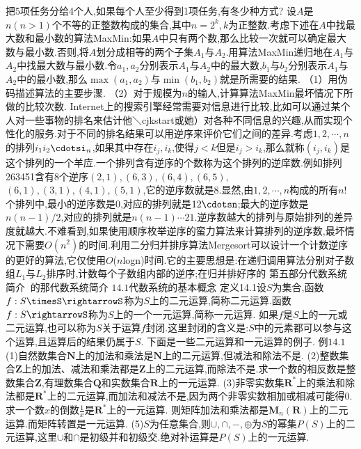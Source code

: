 把5项任务分给4个人,如果每个人至少得到1项任务,有冬少种方式?
设$A$是$n(n>1)$个不等的正整数构成的集合,其中$n=2^{k},k$为正整数.考虑下述在$A$中找最大数和最小数的算法MaxMin:如果$A$中只有两个数,那么比较一次就可以确定最大数与最小数.否则,将$A$划分成相等的两个子集$A_{1}$与$A_{2}$.用算法MaxMin递归地在$A_{1}$与$A_{2}$中找最大数与最小数.令$a_{1},a_{2}$分别表示$A_{1}$与$A_{2}$中的最大数,$b_{1}$与$b_{2}$分别表示$A_{1}$与$A_{2}$中的最小数,那么$\max\left(a_{1},a_{2}\right)$与$\min\left(b_{1},b_{2}\right)$就是所需要的结果.
（1）用伪码描述算法的主要步㵵.
（2）对于规模为$n$的输人,计算算法MaxMin最坏情况下所做的比较次数.
Internet上的搜索引擎经常需要对信息进行比较,比如可以通过某个人对一些事物的排名来估计他＼cjkstart或她）对各种不同信息的兴趣,从而实现个性化的服务.对于不同的排名结果可以用逆序来评价它们之间的差异.考虑$1,2,\cdots,n$的排列$i_{1}i_{2}\cdotsi_{n}$,如果其中存在$i_{j},i_{k}$,使得$j<k$但是$i_{j}>i_{k}$,那么就称$\left(i_{j},i_{k}\right)$是这个排列的一个羊㡴.一个排列含有逆序的个数称为这个排列的逆庠数.例如排列263451含有8个逆序$(2,1),(6,3),(6,4),(6,5)$,$(6,1),(3,1),(4,1),(5,1)$,它的逆序数就是8.显然,由$1,2,\cdots,n$构成的所有$n$!个排列中,最小的逆序数是0,对应的排列就是$12\cdotsn$;最大的逆序数是$n(n-1)/2$,对应的排列就是$n(n-1)\cdots21$.逆序数越大的排列与原始排列的差异度就越大.不难看到,如果使用顺序枚举逆序的蛮力算法来计算排列的逆序数,最坏情况下需要$O\left(n^{2}\right)$的时间.利用二分归并排序算法Mergesort可以设计一个计数逆序的更好的算法,它仅使用$O$($n$logn)时间.它的主要思想是:在递归调用算法分别对子数组$L_{1}$与$L_{2}$排序时,计数每个子数组内部的逆序;在归并排好序的
{第五部分代数系统简介}
{$\mathrm{~的那}$代数系统简介}
{$14.1$代数系统的基本概念}
定义14.1设$S$为集合,函数$f:S\timesS\rightarrowS$称为$S$上的二元运算,简称二元运算.函数$f:S\rightarrowS$称为$S$上的一个一元运算,简称一元运算.
如果$f$是$S$上的一元或二元运算,也可以称为$S$关于运算$f$封闭.这里封闭的含义是:$S$中的元素都可以参与这个运算,且运算后的结果仍属于$S$.
下面是一些二元运算和一元运算的例子.
例$14.1$(1)自然数集合$\mathbf{N}$上的加法和乘法是$\mathbf{N}$上的二元运算,但减法和除法不是.
(2)整数集合$\mathbf{Z}$上的加法、减法和乘法都是$\mathbf{Z}$上的二元运算,而除法不是.求一个数的相反数是整数集合$\mathbf{Z}$,有理数集合$\mathbf{Q}$和实数集合$\mathbf{R}$上的一元运算.
(3)非零实数集$\mathbf{R}^{*}$上的乘法和除法都是$\mathbf{R}^{*}$上的二元运算,而加法和减法不是,因为两个非零实数相加或相减可能得0.求一个数$x$的倒数$\frac{1}{x}$是$\mathbf{R}^{*}$上的一元运算.
则矩阵加法和乘法都是$\boldsymbol{M}_{n}(\mathbf{R})$上的二元运算.而矩阵转置是一元运算.
(5)$S$为任意集合,则$\cup,\cap,-,\oplus$为$S$的幂集$P(S)$上的二元运算,这里$\cup$和$\cap$是初级并和初级交.绝对补运算是$P(S)$上的一元运算.
